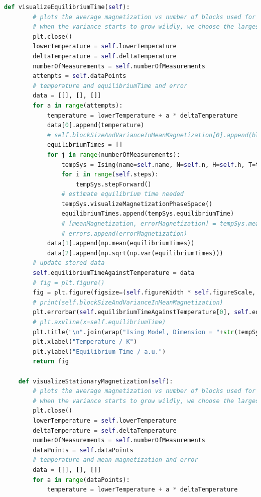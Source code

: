 \documentclass[%
showkeys,
bibnotes,
amsmath,amssymb,
floatfix,
]{revtex4-1}
\begin{document}
\begin{lstlisting}[language=Python]
    def visualizeEquilibriumTime(self):
        # plots the average magnetization vs number of blocks used for measurement
        # when the variance starts to grow wildly, we choose the largest block size with non-diverging error as our correlation length (or time)
        plt.close()
        lowerTemperature = self.lowerTemperature
        deltaTemperature = self.deltaTemperature
        numberOfMeasurements = self.numberOfMeasurements
        attempts = self.dataPoints
        # temperature and equilibriumTime and error
        data = [[], [], []]
        for a in range(attempts):
            temperature = lowerTemperature + a * deltaTemperature
            data[0].append(temperature)
            # self.blockSizeAndVarianceInMeanMagnetization[0].append(blockSize)
            equilibriumTimes = []
            for j in range(numberOfMeasurements):
                tempSys = Ising(name=self.name, N=self.n, H=self.h, T=temperature, D=self.d, J=self.j, randomFill=self.randomFill, K=self.k, M=self.m, equilibriumTime=self.equilibriumTime)
                for i in range(self.steps):
                    tempSys.stepForward()
                # estimate equilibrium time needed
                tempSys.visualizeMagnetizationPhaseSpace()
                equilibriumTimes.append(tempSys.equilibriumTime)
                # [meanMagnetization, errorMagnetization] = tempSys.meanStationaryMagnetization()
                # errors.append(errorMagnetization)
            data[1].append(np.mean(equilibriumTimes))
            data[2].append(np.sqrt(np.var(equilibriumTimes)))
        # update stored data
        self.equilibriumTimeAgainstTemperature = data
        # fig = plt.figure()
        fig = plt.figure(figsize=(self.figureWidth * self.figureScale, self.figureHeight * self.figureScale), dpi=self.figureDpi)
        # print(self.blockSizeAndVarianceInMeanMagnetization)
        plt.errorbar(self.equilibriumTimeAgainstTemperature[0], self.equilibriumTimeAgainstTemperature[1], yerr=self.equilibriumTimeAgainstTemperature[2], fmt="+k")
        # plt.axvline(x=self.equilibriumTime)
        plt.title("\n".join(wrap("Ising Model, Dimension = "+str(tempSys.d)+", N = "+str(tempSys.n)+", Tc = "+str(sigfig.round(float(tempSys.tc), sigfigs=4))+"K, Time = "+str(tempSys.timeStep)+"a.u.", 60)))
        plt.xlabel("Temperature / K")
        plt.ylabel("Equilibrium Time / a.u.")
        return fig

    def visualizeStationaryMagnetization(self):
        # plots the average magnetization vs number of blocks used for measurement
        # when the variance starts to grow wildly, we choose the largest block size with non-diverging error as our correlation length (or time)
        plt.close()
        lowerTemperature = self.lowerTemperature
        deltaTemperature = self.deltaTemperature
        numberOfMeasurements = self.numberOfMeasurements
        dataPoints = self.dataPoints
        # temperature and mean magnetization and error
        data = [[], [], []]
        for a in range(dataPoints):
            temperature = lowerTemperature + a * deltaTemperature


\end{lstlisting}
\end{document}
